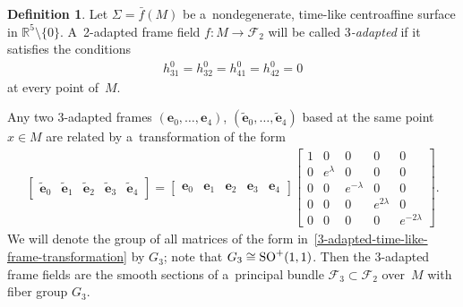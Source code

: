 \documentclass[10pt,a4paper]{amsart}
\numberwithin{equation}{section}
\theoremstyle{definition}
\newtheorem{dfn}[teo]{Definition}
\begin{document}
\begin{dfn}
Let $\Sigma = \bar{f}(M)$ be a~nondegenerate, time-like centroaf\/f\/ine surface in $\mathbb{R}^5 \setminus \{0\}$.
A~2-adapted frame f\/ield $f:M \to \mathcal{F}_2$ will be called {\em $3$-adapted} if it satisf\/ies the conditions
\begin{gather}
h^0_{31} = h^0_{32} = h^0_{41} = h^0_{42} = 0
\label{3-adapted-time-like-h}
\end{gather}
at every point of~$M$.
\end{dfn}

Any two 3-adapted frames $(\mathbf{e}_0, \ldots, \mathbf{e}_4)$, $(\tilde{\mathbf{e}}_0, \ldots, \tilde{\mathbf{e}}_4)$
based at the same point $x \in M$ are related by a~transformation of the form
\begin{gather}
\begin{bmatrix}
\tilde{\mathbf{e}}_0 & \tilde{\mathbf{e}}_1 & \tilde{\mathbf{e}}_2 & \tilde{\mathbf{e}}_3 & \tilde{\mathbf{e}}_4
\end{bmatrix}
=
\begin{bmatrix}
\mathbf{e}_0 & \mathbf{e}_1 & \mathbf{e}_2 & \mathbf{e}_3 & \mathbf{e}_4
\end{bmatrix}
\begin{bmatrix}
1 & 0 & 0 & 0 & 0
\\
0 & e^{\lambda} & 0 & 0 & 0
\\
0 & 0 & e^{-\lambda} & 0 & 0
\\
0 & 0 & 0 & e^{2\lambda} & 0
\\
0 & 0 & 0 & 0 & e^{-2\lambda}
\end{bmatrix}.
\label{3-adapted-time-like-frame-transformation}
\end{gather}
We will denote the group of all matrices of the form in~\eqref{3-adapted-time-like-frame-transformation} by $G_3$; note
that $G_3 \cong {\rm SO}^+(1,1)$.
Then the 3-adapted frame f\/ields are the smooth sections of a~principal bundle $\mathcal{F}_3 \subset \mathcal{F}_2$
over~$M$ with f\/iber group $G_3$.
\end{document}
